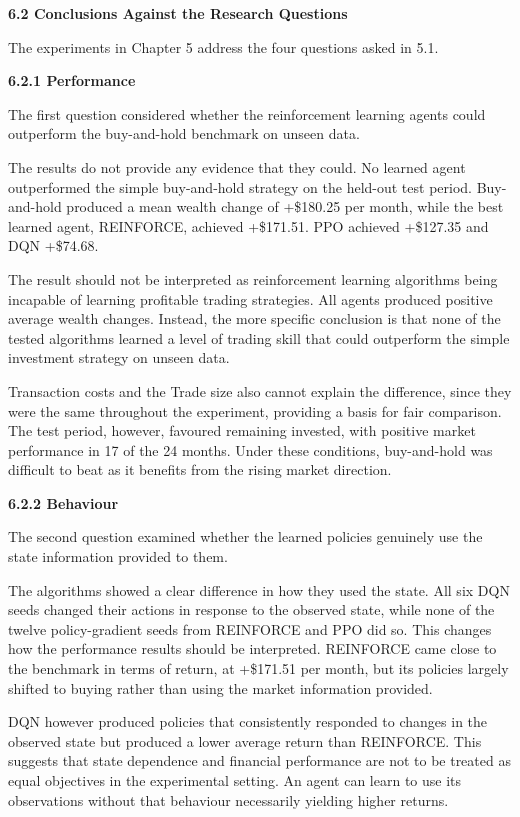\textbf{6.2 Conclusions Against the Research Questions}

The experiments in Chapter 5 address the four questions asked in 5.1.

\textbf{6.2.1 Performance}

The first question considered whether the reinforcement learning agents
could outperform the buy-and-hold benchmark on unseen data.

The results do not provide any evidence that they could. No learned
agent outperformed the simple buy-and-hold strategy on the held-out test
period. Buy-and-hold produced a mean wealth change of +\$180.25 per
month, while the best learned agent, REINFORCE, achieved +\$171.51. PPO
achieved +\$127.35 and DQN +\$74.68.

The result should not be interpreted as reinforcement learning
algorithms being incapable of learning profitable trading strategies.
All agents produced positive average wealth changes. Instead, the more
specific conclusion is that none of the tested algorithms learned a
level of trading skill that could outperform the simple investment
strategy on unseen data.

Transaction costs and the Trade size also cannot explain the difference,
since they were the same throughout the experiment, providing a basis
for fair comparison. The test period, however, favoured remaining
invested, with positive market performance in 17 of the 24 months. Under
these conditions, buy-and-hold was difficult to beat as it benefits from
the rising market direction.

\textbf{6.2.2 Behaviour}

The second question examined whether the learned policies genuinely use
the state information provided to them.

The algorithms showed a clear difference in how they used the state. All
six DQN seeds changed their actions in response to the observed state,
while none of the twelve policy-gradient seeds from REINFORCE and PPO
did so. This changes how the performance results should be interpreted.
REINFORCE came close to the benchmark in terms of return, at +\$171.51
per month, but its policies largely shifted to buying rather than using
the market information provided.

DQN however produced policies that consistently responded to changes in
the observed state but produced a lower average return than REINFORCE.
This suggests that state dependence and financial performance are not to
be treated as equal objectives in the experimental setting. An agent can
learn to use its observations without that behaviour necessarily
yielding higher returns.

